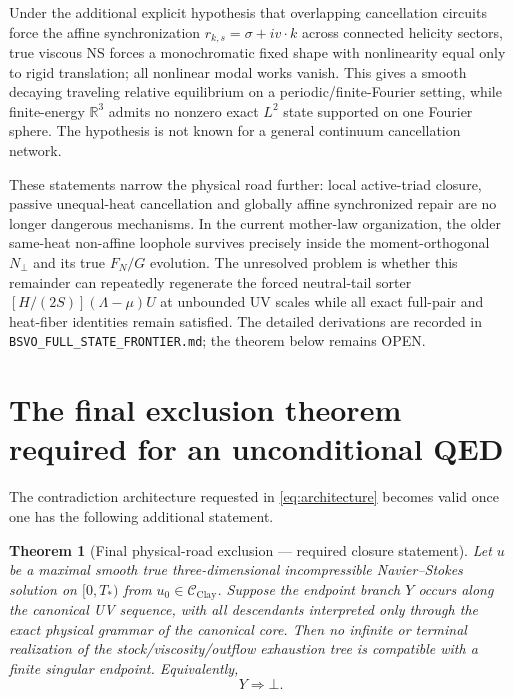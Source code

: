 \documentclass[11pt]{article}
\newtheorem{theorem}{Theorem}[section]
\begin{document}
Under the additional explicit hypothesis that overlapping cancellation circuits force the affine synchronization $r_{k,s}=\sigma+i v\cdot k$ across connected helicity sectors, true viscous NS forces a monochromatic fixed shape with nonlinearity equal only to rigid translation; all nonlinear modal works vanish.  This gives a smooth decaying traveling relative equilibrium on a periodic/finite-Fourier setting, while finite-energy $\mathbb R^3$ admits no nonzero exact $L^2$ state supported on one Fourier sphere.  The hypothesis is not known for a general continuum cancellation network.

These statements narrow the physical road further: local active-triad closure, passive unequal-heat cancellation and globally affine synchronized repair are no longer dangerous mechanisms.  In the current mother-law organization, the older same-heat non-affine loophole survives precisely inside the moment-orthogonal $N_\perp$ and its true $F_N/G$ evolution.  The unresolved problem is whether this remainder can repeatedly regenerate the forced neutral-tail sorter $[H/(2S)](\Lambda-\mu)U$ at unbounded UV scales while all exact full-pair and heat-fiber identities remain satisfied.  The detailed derivations are recorded in \texttt{BSVO\_FULL\_STATE\_FRONTIER.md}; the theorem below remains OPEN.

\section{The final exclusion theorem required for an unconditional QED}

The contradiction architecture requested in \eqref{eq:architecture} becomes valid once one has the following additional statement.

\begin{theorem}[Final physical-road exclusion --- required closure statement]\label{thm:requiredExclusion}
Let $u$ be a maximal smooth true three-dimensional incompressible Navier--Stokes solution on $[0,T_*)$ from $u_0\in\mathcal C_{\mathrm{Clay}}$.  Suppose the endpoint branch $Y$ occurs along the canonical UV sequence, with all descendants interpreted only through the exact physical grammar of the canonical core.  Then no infinite or terminal realization of the stock/viscosity/outflow exhaustion tree is compatible with a finite singular endpoint.  Equivalently,
\begin{equation}\label{eq:YbotRequired}
\boxed{Y\Longrightarrow\bot.}
\end{equation}
\end{theorem}
\end{document}
